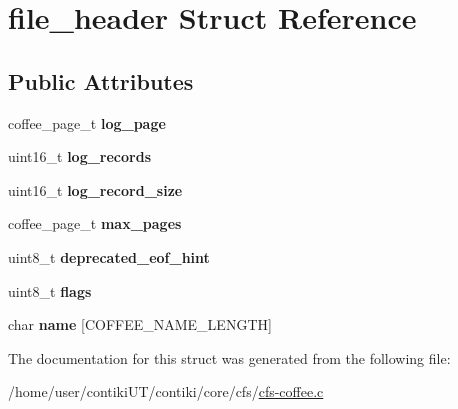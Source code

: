 \hypertarget{structfile__header}{}\section{file\+\_\+header Struct Reference}
\label{structfile__header}
\subsection*{Public Attributes}
\begin{DoxyCompactItemize}
\item 
\hypertarget{structfile__header_ab10f0724756a451f5996b728acae7ee2}{}coffee\+\_\+page\+\_\+t {\bfseries log\+\_\+page}\label{structfile__header_ab10f0724756a451f5996b728acae7ee2}

\item 
\hypertarget{structfile__header_a69df4ca533dd00206f0987912dcdc747}{}uint16\+\_\+t {\bfseries log\+\_\+records}\label{structfile__header_a69df4ca533dd00206f0987912dcdc747}

\item 
\hypertarget{structfile__header_acc98c9cca0210313840be1a90dbb859a}{}uint16\+\_\+t {\bfseries log\+\_\+record\+\_\+size}\label{structfile__header_acc98c9cca0210313840be1a90dbb859a}

\item 
\hypertarget{structfile__header_a30c830f6dcdd3915df466fc5135ff92d}{}coffee\+\_\+page\+\_\+t {\bfseries max\+\_\+pages}\label{structfile__header_a30c830f6dcdd3915df466fc5135ff92d}

\item 
\hypertarget{structfile__header_ae37c916bb0eff284ba133e7e3c5159c8}{}uint8\+\_\+t {\bfseries deprecated\+\_\+eof\+\_\+hint}\label{structfile__header_ae37c916bb0eff284ba133e7e3c5159c8}

\item 
\hypertarget{structfile__header_a24491b5b307afaca1752ad23d10c5e03}{}uint8\+\_\+t {\bfseries flags}\label{structfile__header_a24491b5b307afaca1752ad23d10c5e03}

\item 
\hypertarget{structfile__header_a8dbc1597257a185978026165229456ba}{}char {\bfseries name} \mbox{[}C\+O\+F\+F\+E\+E\+\_\+\+N\+A\+M\+E\+\_\+\+L\+E\+N\+G\+T\+H\mbox{]}\label{structfile__header_a8dbc1597257a185978026165229456ba}

\end{DoxyCompactItemize}


The documentation for this struct was generated from the following file\+:\begin{DoxyCompactItemize}
\item 
/home/user/contiki\+U\+T/contiki/core/cfs/\hyperlink{cfs-coffee_8c}{cfs-\/coffee.\+c}\end{DoxyCompactItemize}

